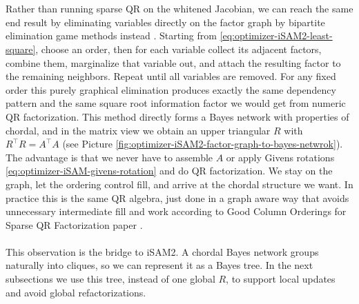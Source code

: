 \\ \\
Rather than running sparse QR on the whitened Jacobian, we can reach the same end result by eliminating variables directly on the factor graph by bipartite elimination game methods instead \cite{QR_factorization}. Starting from \eqref{eq:optimizer-iSAM2-least-square}, choose an order, then for each variable collect its adjacent factors, combine them, marginalize that variable out, and attach the resulting factor to the remaining neighbors. Repeat until all variables are removed. For any fixed order this purely graphical elimination produces exactly the same dependency pattern and the same square root information factor we would get from numeric QR factorization. This method directly forms a Bayes network with properties of chordal, and in the matrix view we obtain an upper triangular $R$ with $R^\top R = A^\top A$ (see Picture \ref{fig:optimizer-iSAM2-factor-graph-to-bayes-netwrok}). The advantage is that we never have to assemble $A$ or apply Givens rotations \eqref{eq:optimizer-iSAM-givens-rotation} and do QR factorization. We stay on the graph, let the ordering control fill, and arrive at the chordal structure we want. In practice this is the same QR algebra, just done in a graph aware way that avoids unnecessary intermediate fill and work according to Good Column Orderings for Sparse QR Factorization paper \cite{QR_factorization}.
\\ \\
This observation is the bridge to iSAM2. A chordal Bayes network groups naturally into cliques, so we can represent it as a Bayes tree. In the next subsections we use this tree, instead of one global $R$, to support local updates and avoid global refactorizations.



